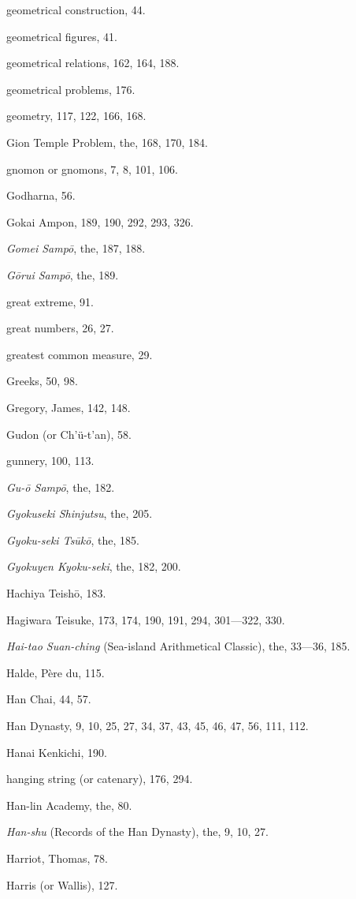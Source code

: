 \documentclass[11pt]{article}
\begin{document}
geometrical construction, 44.\par
geometrical figures, 41.\par
geometrical relations, 162, 164, 188.\par
geometrical problems, 176.\par
geometry, 117, 122, 166, 168.\par
Gion Temple Problem, the, 168, 170, 184.\par
gnomon or gnomons, 7, 8, 101, 106.\par
Godharna, 56.\par
Gokai Ampon, 189, 190, 292, 293, 326.\par
\emph{Gomei Sampō}, the, 187, 188.\par
\emph{Gōrui Sampō}, the, 189.\par
great extreme, 91.\par
great numbers, 26, 27.\par
greatest common measure, 29.\par
Greeks, 50, 98.\par
Gregory, James, 142, 148.\par
Gudon (or Ch'ü-t'an), 58.\par
gunnery, 100, 113.\par
\emph{Gu-ō Sampō}, the, 182.\par
\emph{Gyokuseki Shinjutsu}, the, 205.\par
\emph{Gyoku-seki Tsūkō}, the, 185.\par
\emph{Gyokuyen Kyoku-seki}, the, 182, 200.\par
\medskip
Hachiya Teishō, 183.\par
Hagiwara Teisuke, 173, 174, 190, 191, 294, 301---322, 330.\par
\emph{Hai-tao Suan-ching} (Sea-island Arithmetical Classic), the, 33---36, 185.\par
Halde, Père du, 115.\par
Han Chai, 44, 57.\par
Han Dynasty, 9, 10, 25, 27, 34, 37, 43, 45, 46, 47, 56, 111, 112.\par
Hanai Kenkichi, 190.\par
hanging string (or catenary), 176, 294.\par
Han-lin Academy, the, 80.\par
\emph{Han-shu} (Records of the Han Dynasty), the, 9, 10, 27.\par
Harriot, Thomas, 78.\par
Harris (or Wallis), 127.\par
\end{document}
